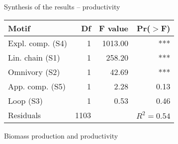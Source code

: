 \documentclass[professionalfonts]{beamer}
\begin{document}
\begin{frame}{Synthesis of the results -- productivity}
	\begin{center}
		\begin{tabular}{lrrr}
			\hline
			Motif & Df & F value & Pr($>$F) \\ 
			\hline
			\rowcolor{RYB4} Expl. comp. (S4) & 1 & 1013.00 & *** \\ 
			\rowcolor{RYB1} Lin. chain (S1) & 1 & 258.20 & *** \\ 
			\rowcolor{RYB2} Omnivory (S2) & 1 & 42.69 & *** \\ 
			\rowcolor{RYB5} App. comp. (S5) & 1 & 2.28 & 0.13 \\ 
			\rowcolor{RYB3} Loop (S3) & 1 & 0.53 & 0.46 \\ 
			\hline
			Residuals & 1103 &  &  $R^{2} = 0.54$  \\ 
			\hline
		\end{tabular}
	\end{center}
\end{frame}

\begin{frame}{Biomass production and productivity}
	\begin{center}
	\end{center}
\end{frame}
\end{document}
